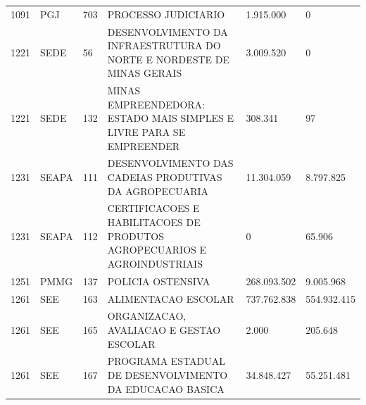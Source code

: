 \documentclass{article}
\begin{document}
\begin{longtable}[c]{m{1cm}|m{1.5cm}|m{1cm}m{8cm}|m{2cm}m{2cm}}
\multicolumn{1}{C{1cm}|}{1091} & \multicolumn{1}{L{1.5cm}|}{PGJ} & \multicolumn{1}{C{1cm}|}{703} & \multicolumn{1}{L{8cm}|}{PROCESSO JUDICIARIO} & \multicolumn{1}{R{2cm}|}{1.915.000} & \multicolumn{1}{R{2cm}}{            0} \\
\multicolumn{1}{C{1cm}|}{1221} & \multicolumn{1}{L{1.5cm}|}{SEDE} & \multicolumn{1}{C{1cm}|}{56} & \multicolumn{1}{L{8cm}|}{DESENVOLVIMENTO DA INFRAESTRUTURA DO NORTE E NORDESTE DE MINAS GERAIS} & \multicolumn{1}{R{2cm}|}{3.009.520} & \multicolumn{1}{R{2cm}}{            0} \\
\multicolumn{1}{C{1cm}|}{1221} & \multicolumn{1}{L{1.5cm}|}{SEDE} & \multicolumn{1}{C{1cm}|}{132} & \multicolumn{1}{L{8cm}|}{MINAS EMPREENDEDORA: ESTADO MAIS SIMPLES E LIVRE PARA SE EMPREENDER} & \multicolumn{1}{R{2cm}|}{308.341} & \multicolumn{1}{R{2cm}}{97} \\
\multicolumn{1}{C{1cm}|}{1231} & \multicolumn{1}{L{1.5cm}|}{SEAPA} & \multicolumn{1}{C{1cm}|}{111} & \multicolumn{1}{L{8cm}|}{DESENVOLVIMENTO DAS CADEIAS PRODUTIVAS DA AGROPECUARIA} & \multicolumn{1}{R{2cm}|}{11.304.059} & \multicolumn{1}{R{2cm}}{8.797.825} \\
\multicolumn{1}{C{1cm}|}{1231} & \multicolumn{1}{L{1.5cm}|}{SEAPA} & \multicolumn{1}{C{1cm}|}{112} & \multicolumn{1}{L{8cm}|}{CERTIFICACOES E HABILITACOES DE PRODUTOS AGROPECUARIOS E AGROINDUSTRIAIS} & \multicolumn{1}{R{2cm}|}{            0} & \multicolumn{1}{R{2cm}}{65.906} \\
\multicolumn{1}{C{1cm}|}{1251} & \multicolumn{1}{L{1.5cm}|}{PMMG} & \multicolumn{1}{C{1cm}|}{137} & \multicolumn{1}{L{8cm}|}{POLICIA OSTENSIVA} & \multicolumn{1}{R{2cm}|}{268.093.502} & \multicolumn{1}{R{2cm}}{9.005.968} \\
\multicolumn{1}{C{1cm}|}{1261} & \multicolumn{1}{L{1.5cm}|}{SEE} & \multicolumn{1}{C{1cm}|}{163} & \multicolumn{1}{L{8cm}|}{ALIMENTACAO ESCOLAR} & \multicolumn{1}{R{2cm}|}{737.762.838} & \multicolumn{1}{R{2cm}}{554.932.415} \\
\multicolumn{1}{C{1cm}|}{1261} & \multicolumn{1}{L{1.5cm}|}{SEE} & \multicolumn{1}{C{1cm}|}{165} & \multicolumn{1}{L{8cm}|}{ORGANIZACAO, AVALIACAO E GESTAO ESCOLAR} & \multicolumn{1}{R{2cm}|}{2.000} & \multicolumn{1}{R{2cm}}{205.648} \\
\multicolumn{1}{C{1cm}|}{1261} & \multicolumn{1}{L{1.5cm}|}{SEE} & \multicolumn{1}{C{1cm}|}{167} & \multicolumn{1}{L{8cm}|}{PROGRAMA ESTADUAL DE DESENVOLVIMENTO DA EDUCACAO BASICA} & \multicolumn{1}{R{2cm}|}{34.848.427} & \multicolumn{1}{R{2cm}}{55.251.481} \\

\end{longtable}
\end{document}

